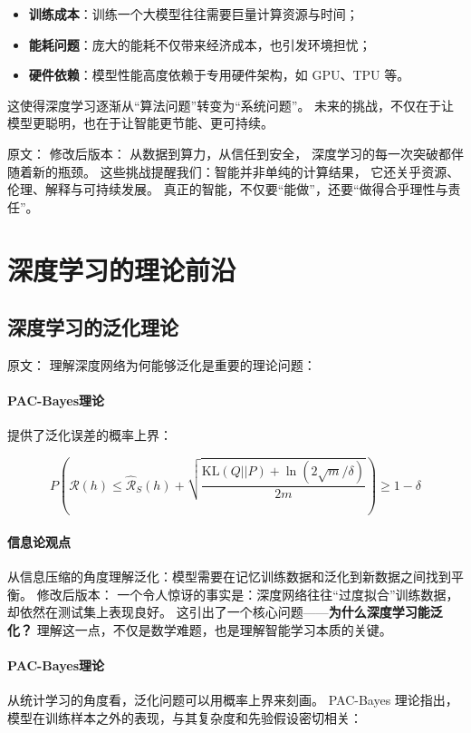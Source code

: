 \begin{itemize}
\item \textbf{训练成本}：训练一个大模型往往需要巨量计算资源与时间；
\item \textbf{能耗问题}：庞大的能耗不仅带来经济成本，也引发环境担忧；
\item \textbf{硬件依赖}：模型性能高度依赖于专用硬件架构，如 GPU、TPU 等。
\end{itemize}

这使得深度学习逐渐从“算法问题”转变为“系统问题”。  
未来的挑战，不仅在于让模型更聪明，也在于让智能更节能、更可持续。



原文：
修改后版本：
从数据到算力，从信任到安全，  
深度学习的每一次突破都伴随着新的瓶颈。  
这些挑战提醒我们：智能并非单纯的计算结果，  
它还关乎资源、伦理、解释与可持续发展。  
真正的智能，不仅要“能做”，还要“做得合乎理性与责任”。

\section{深度学习的理论前沿}

\subsection{深度学习的泛化理论}

原文：
理解深度网络为何能够泛化是重要的理论问题：

\paragraph{PAC-Bayes理论}
提供了泛化误差的概率上界：

$$P\left(\mathcal{R}(h) \leq \hat{\mathcal{R}}_S(h) + \sqrt{\frac{\text{KL}(Q||P) + \ln(2\sqrt{m}/\delta)}{2m}}\right) \geq 1-\delta$$

\paragraph{信息论观点}
从信息压缩的角度理解泛化：模型需要在记忆训练数据和泛化到新数据之间找到平衡。
修改后版本：
一个令人惊讶的事实是：深度网络往往“过度拟合”训练数据，却依然在测试集上表现良好。  
这引出了一个核心问题——\textbf{为什么深度学习能泛化？}  
理解这一点，不仅是数学难题，也是理解智能学习本质的关键。

\paragraph{PAC-Bayes理论}  
从统计学习的角度看，泛化问题可以用概率上界来刻画。  
PAC-Bayes 理论指出，模型在训练样本之外的表现，与其复杂度和先验假设密切相关：


